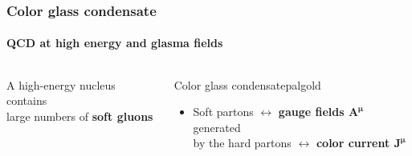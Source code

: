 \documentclass[aspectratio=169,11pt,usenames,dvipsnames]{beamer}
\begin{document}
\begin{frame}
    \frametitle{Color glass condensate}
    \framesubtitle{QCD at high energy and glasma fields}
    \vspace{-15pt}
    \begin{columns}[onlytextwidth,t]

            \begin{center}
                \footnotesize\color{lightgray}A high-energy nucleus contains \\ large numbers of {\bfseries\color{palviolet}soft gluons}
            \end{center}

            \vspace{0pt}
            \hspace{10pt}

            \vspace{0pt}
           
            \begin{custombox2}{Color glass condensate}{palgold}
                \small
                \begin{varwidth}{0.92\textwidth}
                \begin{itemize}\itemsep0em 
                    \item 
                    Soft partons $\leftrightarrow$ {\color{palviolet}\bfseries gauge fields $\boldsymbol{A^\mu}$} generated \\ by the hard partons $\leftrightarrow$ {\color{palteal}\bfseries color current $\boldsymbol{J^\mu}$}
                \end{itemize}
                \end{varwidth}
            \end{custombox2}


\end{columns}
\end{frame}
\end{document}
